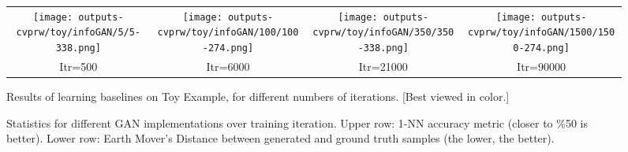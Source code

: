 \documentclass[10pt,twocolumn,letterpaper]{article}
\begin{document}
\begin{figure}
\begin{center}
\begin{tabular}{cccc}
		
		\rotatebox{90}{~~InfoGAN}
		\texttt{[image: outputs-cvprw/toy/infoGAN/5/5-338.png]}& 
		\hspace{-0.4 cm}
		\texttt{[image: outputs-cvprw/toy/infoGAN/100/100-274.png]}&
		\hspace{-0.4 cm}
		\texttt{[image: outputs-cvprw/toy/infoGAN/350/350-338.png]}&
		\hspace{-0.4 cm}
		\texttt{[image: outputs-cvprw/toy/infoGAN/1500/1500-274.png]} \\	
		Itr=500 & Itr=6000 & Itr=21000 & Itr=90000
\end{tabular}
\end{center}
\caption{Results of learning baselines on Toy Example, for different numbers of iterations. [Best viewed in color.]}
\vspace{-0.2cm}
\label{fig:toy_output}		
\end{figure}

\begin{figure*}
	\centering
	\begin{subfigure}
		{\texttt{[image: figs/1nn-2.pdf]}}
		\label{fig:y equals a}
	\end{subfigure}
	
	\begin{subfigure}
		{\texttt{[image: figs/EMD-2.pdf]}}
		\label{fig:y equals b}
	\end{subfigure}
	\caption{Statistics for different GAN implementations over training iteration. Upper row: 1-NN accuracy metric (closer to \%50 is better). Lower row: Earth Mover's Distance between generated and ground truth samples (the lower, the better).}
	\label{analysis_1nn_emd}	
\end{figure*}
\end{document}
